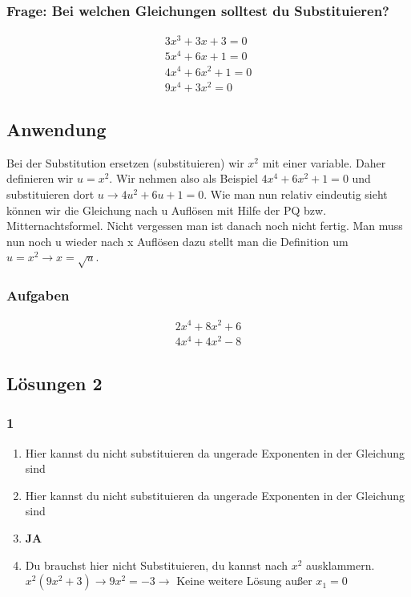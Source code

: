 \documentclass[11pt,a4paper]{article}
\begin{document}
\subsubsection*{Frage: Bei welchen Gleichungen solltest du Substituieren?}
\begin{eqnarray}
3x^3 + 3x + 3 = 0\\
5x^4 + 6x + 1 = 0\\
4x^4 + 6x^2 + 1 = 0\\
9x^4 + 3x^2 = 0
\end{eqnarray}

\subsection{Anwendung}
Bei der Substitution ersetzen (substituieren) wir $x^2$ mit einer variable. Daher definieren wir $u = x^2$. Wir nehmen also als Beispiel $4x^4 + 6x^2 + 1 = 0$ und substituieren dort $u \rightarrow 4u^2 + 6u + 1 = 0$. Wie man nun relativ eindeutig sieht können wir die Gleichung nach u Auflösen mit Hilfe der PQ bzw. Mitternachtsformel. Nicht vergessen man ist danach noch nicht fertig. Man muss nun noch u wieder nach x Auflösen dazu stellt man die Definition um $u = x^2 \rightarrow x = \sqrt{u}$.

\subsubsection*{Aufgaben}
\begin{eqnarray}
2x^4 + 8x^2 + 6\\
4x^4 + 4x^2 - 8
\end{eqnarray}

\newpage

\subsection{Lösungen 2}

\subsubsection*{1}
\begin{enumerate}
\item Hier kannst du nicht substituieren da ungerade Exponenten in der Gleichung sind
\item Hier kannst du nicht substituieren da ungerade Exponenten in der Gleichung sind
\item \textbf{JA}
\item Du brauchst hier nicht Substituieren, du kannst nach $x^2$ ausklammern. $x^2(9x^2 + 3) \rightarrow 9x^2 = -3 \rightarrow$ Keine weitere Lösung außer $x_1 = 0$
\end{enumerate}
\end{document}
